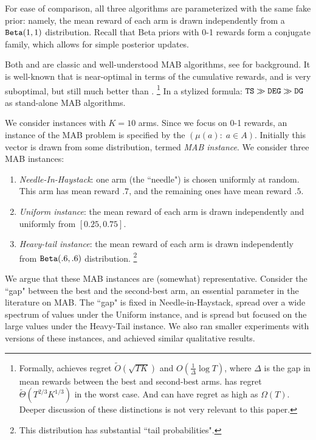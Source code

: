 \documentclass[../competing_bandits.tex]{subfiles}
\begin{document}
For ease of comparison, all three algorithms are parameterized with the same fake prior: namely, the mean reward of each arm is drawn independently from a $\mathtt{Beta}(1,1)$ distribution. Recall that Beta priors with 0-1 rewards form a conjugate family, which allows for simple posterior updates.

Both \DEG and \TS are classic and well-understood MAB algorithms, see \cite{Bubeck-survey12,TS-survey-FTML18} for background. It is well-known that \TS is near-optimal in terms of the cumulative rewards, and \DEG is very suboptimal, but still much better than \DG.%
\footnote{Formally, \TS achieves regret
    $\tilde{O}(\sqrt{TK})$ and
    $O(\tfrac{1}{\Delta} \log T)$,
where $\Delta$ is the gap in mean rewards between the best and second-best arms. \DEG has regret $\tilde{\Theta}(T^{2/3} K^{1/3})$ in the worst case. And \DG can have regret as high as $\Omega(T)$. Deeper discussion of these distinctions is not very relevant to this paper.}
In a stylized formula:
    $ \mathtt{TS} \gg \mathtt{DEG} \gg \mathtt{DG} $
as stand-alone MAB algorithms.

We consider instances with $K=10$ arms. Since we focus on 0-1 rewards, an instance of the MAB problem is specified by the \emph{\MRV} $(\mu(a):\; a\in A)$. Initially this vector is drawn from some distribution, termed \emph{MAB instance}. We consider three MAB instances:
\begin{enumerate}
\item \emph{Needle-In-Haystack}: one arm (the ``needle") is chosen uniformly at random. This arm has mean reward $.7$, and the remaining ones have mean reward $.5$.

\item \emph{Uniform instance}: the mean reward of each arm is drawn independently and uniformly from $[0.25, 0.75]$.
\item \emph{Heavy-tail instance}: the mean reward of each arm is drawn independently from $\mathtt{Beta}(.6,.6)$ distribution.%
    \footnote{This distribution has substantial ``tail probabilities".}
\end{enumerate}
We argue that these MAB instances are (somewhat) representative. Consider the ``gap" between the best and the second-best arm, an essential parameter in the literature on MAB. The ``gap" is fixed in Needle-in-Haystack, spread over a wide spectrum of values under the Uniform instance, and is spread but  focused on the large values under the Heavy-Tail instance. We also ran smaller experiments with versions of these instances, and achieved similar qualitative results.
\end{document}
